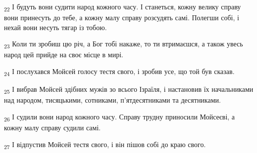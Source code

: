 \begin{tcolorbox}
\textsubscript{22} І будуть вони судити народ кожного часу. І станеться, кожну велику справу вони принесуть до тебе, а кожну малу справу розсудять самі. Полегши собі, і нехай вони несуть тягар із тобою.
\end{tcolorbox}
\begin{tcolorbox}
\textsubscript{23} Коли ти зробиш цю річ, а Бог тобі накаже, то ти втримаєшся, а також увесь народ цей прийде на своє місце в мирі.
\end{tcolorbox}
\begin{tcolorbox}
\textsubscript{24} І послухався Мойсей голосу тестя свого, і зробив усе, що той був сказав.
\end{tcolorbox}
\begin{tcolorbox}
\textsubscript{25} І вибрав Мойсей здібних мужів зо всього Ізраїля, і настановив їх начальниками над народом, тисяцькими, сотниками, п'ятдесятниками та десятниками.
\end{tcolorbox}
\begin{tcolorbox}
\textsubscript{26} І судили вони народ кожного часу. Справу трудну приносили Мойсеєві, а кожну малу справу судили самі.
\end{tcolorbox}
\begin{tcolorbox}
\textsubscript{27} І відпустив Мойсей тестя свого, і він пішов собі до краю свого.
\end{tcolorbox}
